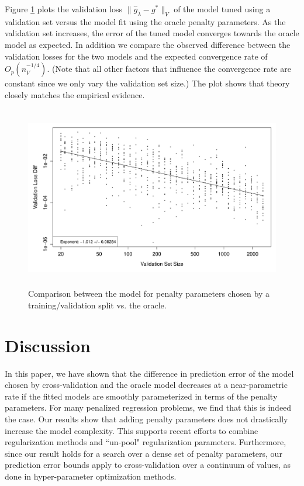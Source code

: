 \documentclass[12pt]{article}
\begin{document}
Figure \ref{fig:emp_v_theory} plots the validation loss $\| \hat{g}_{\lambda} - g^* \|_V$ of the model tuned using a validation set versus the model fit using the oracle penalty parameters. As the validation set increases, the error of the tuned model converges towards the oracle model as expected. In addition we compare the observed difference between the validation losses for the two models and the expected convergence rate of $O_p\left (n_{V}^{-1/4} \right)$. (Note that all other factors that influence the convergence rate are constant since we only vary the validation set size.) The plot shows that theory closely matches the empirical evidence.

\begin{figure}
\label{fig:emp_v_theory}
\caption{
	Comparison between the model for penalty parameters chosen by a training/validation split vs. the oracle.
}
\centering
\includegraphics[height=80mm]{../R/figures/validation_size_loss_diff.pdf}
\end{figure}

\section{Discussion}\label{sec:discussion}

In this paper, we have shown that the difference in prediction error of the model chosen by cross-validation and the oracle model decreases at a near-parametric rate if the fitted models are smoothly parameterized in terms of the penalty parameters. For many penalized regression problems, we find that this is indeed the case. Our results show that adding penalty parameters does not drastically increase the model complexity. This supports recent efforts to combine regularization methods and ``un-pool" regularization parameters. Furthermore, since our result holds for a search over a dense set of penalty parameters, our prediction error bounds apply to cross-validation over a continuum of values, as done in hyper-parameter optimization methods.
\end{document}

